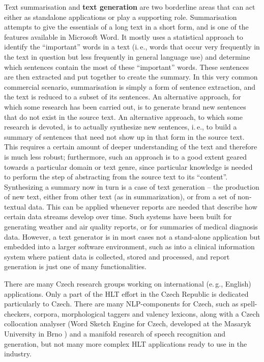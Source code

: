 \begin{multicols}{2}
Text summarisation and \textbf{text generation} are two borderline areas that can act either as standalone applications or play a supporting role. Summarisation attempts to give the essentials of a long text in a short form, and is one of the features available in Microsoft Word. It mostly uses a statistical approach to identify the “important” words in a text (i.\,e., words that occur very frequently in the text in question but less frequently in general language use) and determine which sentences contain the most of these “important” words. These sentences are then extracted and put together to create the summary. In this very common commercial scenario, summarisation is simply a form of sentence extraction, and the text is reduced to a subset of its sentences. An alternative approach, for which some research has been carried out, is to generate brand new sentences that do not exist in the source text.
An alternative approach, to which some research is devoted, is to actually synthesize new sentences, i.\,e., to build a summary of sentences that need not show up in that form in the source text. This requires a certain amount of deeper understanding of the text and therefore is much less robust; furthermore, such an approach is to a good extent geared towards a particular domain or text genre, since particular knowledge is needed to perform the step of abstracting from the source text to its “content”. Synthesizing a summary now in turn is a case of text generation -- the production of new text, either from other text (as in summarization), or from a set of non-textual data. This can be applied whenever reports are needed that describe how certain data streams develop over time. Such systems have been built for generating weather and air quality reports, or for summaries of medical diagnosis data. However, a text generator is in most cases not a stand-alone application but embedded into a larger software environment, such as into a clinical information system where patient data is collected, stored and processed, and report generation is just one of many functionalities.

There are many Czech research groups working on international (e.\,g., English) applications. Only a part of the HLT effort in the Czech Republic is dedicated particularly to Czech. There are many NLP-components for Czech, such as spell-checkers, corpora, morphological taggers and valency lexicons, along with a Czech collocation analyser (Word Sketch Engine for Czech, developed at the Masaryk University in Brno \cite{Horak2009}) and a manifold research of speech recognition and generation, but not many more complex HLT applications ready to use in the industry.


\end{multicols}
